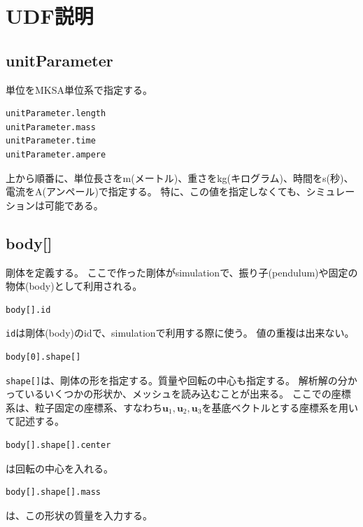 \documentclass[a4paper,11pt]{jbook}
\begin{document}
\chapter{UDF説明}
\section{unitParameter}
単位をMKSA単位系で指定する。
\begin{verbatim}
unitParameter.length
unitParameter.mass
unitParameter.time
unitParameter.ampere
\end{verbatim}
上から順番に、単位長さをm(メートル)、重さをkg(キログラム)、時間をs(秒)、電流をA(アンペール)で指定する。
特に、この値を指定しなくても、シミュレーションは可能である。
\section{body[]}
剛体を定義する。
ここで作った剛体がsimulationで、振り子(pendulum)や固定の物体(body)として利用される。
\begin{verbatim}
body[].id
\end{verbatim}
\verb|id|は剛体(body)のidで、simulationで利用する際に使う。
値の重複は出来ない。
\begin{verbatim}
body[0].shape[]
\end{verbatim}
\verb|shape[]|は、剛体の形を指定する。質量や回転の中心も指定する。
解析解の分かっているいくつかの形状か、メッシュを読み込むことが出来る。
ここでの座標系は、粒子固定の座標系、すなわち$\bm{u}_1,\bm{u}_2,\bm{u}_3$を基底ベクトルとする座標系を用いて記述する。
\begin{verbatim}
body[].shape[].center
\end{verbatim}
は回転の中心を入れる。

\begin{verbatim}
body[].shape[].mass
\end{verbatim}
は、この形状の質量を入力する。
\end{document}
